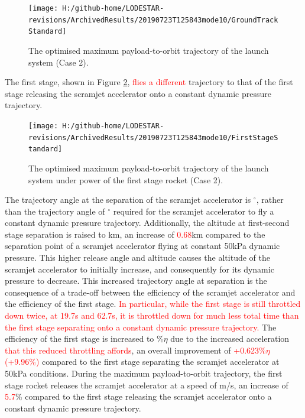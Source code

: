 \begin{figure}[ht!]%
	
	
	
	\centering
	\texttt{[image: H:/github-home/LODESTAR-revisions/ArchivedResults/20190723T125843mode10/GroundTrackStandard]}
	\caption{The optimised maximum payload-to-orbit trajectory of the launch system (Case 2).}
	\label{fig:GroundTrackStandardNoReturn}
\end{figure}


The first stage, shown in Figure \ref{fig:FirstStageStandardNoReturn}, \textcolor{red}{flies a different} trajectory to that of the first stage releasing the scramjet accelerator onto a constant dynamic pressure trajectory.
\begin{figure}[ht!]%
	\centering
	\texttt{[image: H:/github-home/LODESTAR-revisions/ArchivedResults/20190723T125843mode10/FirstStageStandard]}
	\caption{The optimised maximum payload-to-orbit trajectory of the launch system under power of the first stage rocket (Case 2).}
	\label{fig:FirstStageStandardNoReturn}
\end{figure}
 The trajectory angle at the separation of the scramjet accelerator is \secondthirdSeparationgammaqStandardNoReturn$^\circ$, rather than the trajectory angle of \secondthirdSeparationgammaConstqNoReturn$^\circ$ required for the scramjet accelerator to fly a constant dynamic pressure trajectory. Additionally, the altitude at first-second stage separation is raised to \firstsecondSeparationAltStandardNoReturn km, an increase of \textcolor{red}{0.68}km compared to the separation point of a scramjet accelerator flying at constant 50kPa dynamic pressure. This higher release angle and altitude causes the altitude of the scramjet accelerator to initially increase, and consequently for its dynamic pressure to decrease. This increased trajectory angle at separation is the consequence of a trade-off between the efficiency of the scramjet accelerator and the efficiency of the first stage. \textcolor{red}{In particular, while the first stage is still throttled down twice, at 19.7s and 62.7s, it is throttled down for much less total time than the first stage separating onto a constant dynamic pressure trajectory. }
 The efficiency of the first stage is increased to \firstExergyEffStandardNoReturn\%$\eta$ due to the increased acceleration \textcolor{red}{that this reduced throttling affords}, an overall improvement of \textcolor{red}{+0.623\%$\eta$ (+9.96\%)} compared to the first stage separating the scramjet accelerator at 50kPa conditions. 
 During the maximum payload-to-orbit trajectory, the first stage rocket releases the scramjet accelerator at a speed of \firstsecondSeparationvStandardNoReturn m/s, an increase of \textcolor{red}{5.7}\% compared to the first stage releasing the scramjet accelerator onto a constant dynamic pressure trajectory.


